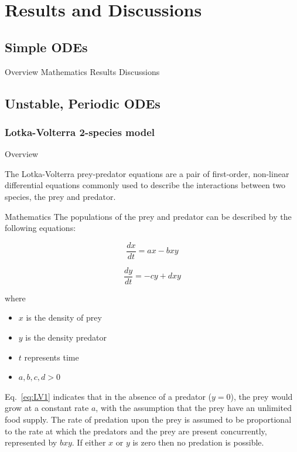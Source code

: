 \documentclass[11pt]{article}
\begin{document}
\section{Results and Discussions}
\subsection{Simple ODEs}
Overview
\break
Mathematics
\break
Results 
\break
Discussions


\subsection{Unstable, Periodic ODEs}


\subsubsection{Lotka-Volterra  2-species model}
Overview
\break

The Lotka-Volterra prey-predator equations are a pair of first-order, non-linear differential equations commonly used to describe the interactions between two species, the prey and predator.
\break

Mathematics
\break
The populations of the prey and predator can be described by the following equations:

    \begin{equation}
      \frac{dx}{dt} = ax - bxy
      \label{eq:LV1}
    \end{equation}
    
     \begin{equation}
      \frac{dy}{dt} = -cy + dxy
      \label{eq:LV2}
    \end{equation}
    

where
\begin{itemize}
\item $x$ is the density of prey
\item $y$ is the density predator
\item $t$ represents time
\item $a, b, c, d >0$ 
\end{itemize}

Eq.~\ref{eq:LV1} indicates that in the absence of a predator ($y = 0$), the prey would grow at a constant rate $a$, with the assumption that the prey have an unlimited food supply. The rate of predation upon the prey is assumed to be proportional to the rate at which the predators and the prey are present concurrently, represented by $bxy$. If either $x$ or $y$ is zero then no predation is possible.
\end{document}
